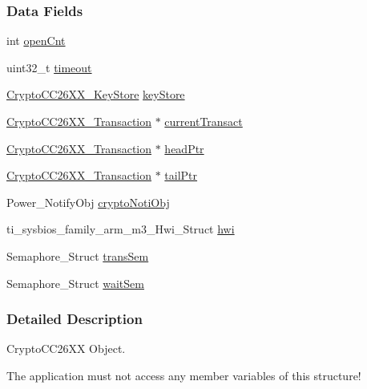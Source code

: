 \subsubsection*{Data Fields}
\begin{DoxyCompactItemize}
\item 
int \hyperlink{struct_crypto_c_c26_x_x___object_aed6ed8c1a1fb38542f0a66bac8b207d1}{open\-Cnt}
\item 
uint32\-\_\-t \hyperlink{struct_crypto_c_c26_x_x___object_a7bf2c514e22988c397d2b49e5a7be53b}{timeout}
\item 
\hyperlink{_crypto_c_c26_x_x_8h_a30e647b6ad6b608b60990929200686e0}{Crypto\-C\-C26\-X\-X\-\_\-\-Key\-Store} \hyperlink{struct_crypto_c_c26_x_x___object_a73d676dd4ff0815b55058c15c6315bb9}{key\-Store}
\item 
\hyperlink{struct_crypto_c_c26_x_x___transaction}{Crypto\-C\-C26\-X\-X\-\_\-\-Transaction} $\ast$ \hyperlink{struct_crypto_c_c26_x_x___object_a6ebc5fa5ae8455db12e9a01b34a75dbf}{current\-Transact}
\item 
\hyperlink{struct_crypto_c_c26_x_x___transaction}{Crypto\-C\-C26\-X\-X\-\_\-\-Transaction} $\ast$ \hyperlink{struct_crypto_c_c26_x_x___object_a6723e9a4eb86f36e8860c5ef541466fc}{head\-Ptr}
\item 
\hyperlink{struct_crypto_c_c26_x_x___transaction}{Crypto\-C\-C26\-X\-X\-\_\-\-Transaction} $\ast$ \hyperlink{struct_crypto_c_c26_x_x___object_a7474f4d229f4f9274dbfa2b0766b52ce}{tail\-Ptr}
\item 
Power\-\_\-\-Notify\-Obj \hyperlink{struct_crypto_c_c26_x_x___object_ac6f020255e0552838fa662df76bfdb8e}{crypto\-Noti\-Obj}
\item 
ti\-\_\-sysbios\-\_\-family\-\_\-arm\-\_\-m3\-\_\-\-Hwi\-\_\-\-Struct \hyperlink{struct_crypto_c_c26_x_x___object_ade45a49db795267b21c108926d3a69a2}{hwi}
\item 
Semaphore\-\_\-\-Struct \hyperlink{struct_crypto_c_c26_x_x___object_add5ff652a01c8f755f9ffc6da8ff7781}{trans\-Sem}
\item 
Semaphore\-\_\-\-Struct \hyperlink{struct_crypto_c_c26_x_x___object_a5845db71c0440f667b9ab19e22ee8fd5}{wait\-Sem}
\end{DoxyCompactItemize}


\subsubsection{Detailed Description}
Crypto\-C\-C26\-X\-X Object. 

The application must not access any member variables of this structure! 

